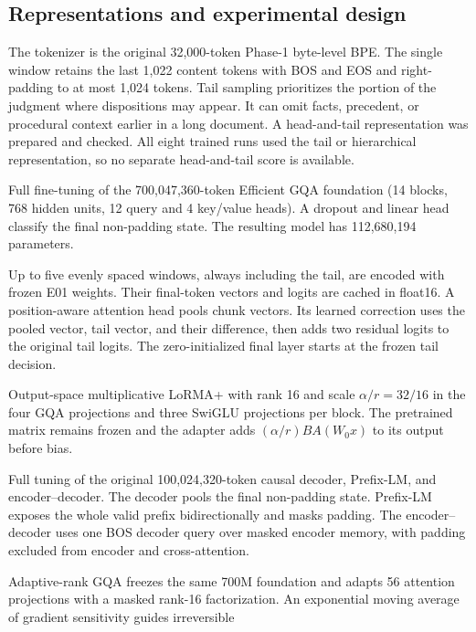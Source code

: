 \subsection{Representations and experimental design}

The tokenizer is the original 32,000-token Phase-1 byte-level BPE. The single
window retains the last 1,022 content tokens with BOS and EOS and right-padding
to at most 1,024 tokens. Tail sampling prioritizes the portion of the judgment
where dispositions may appear. It can omit facts, precedent, or procedural
context earlier in a long document. A head-and-tail representation was
prepared and checked. All eight trained runs used the tail or hierarchical
representation, so no separate head-and-tail score is available.

\begin{description}[leftmargin=1.4em]
\item[E01.] Full fine-tuning of the 700,047,360-token Efficient GQA
  foundation (14 blocks, 768 hidden units, 12 query and 4 key/value heads).
  A dropout and linear head classify the final non-padding state. The
  resulting model has 112,680,194 parameters.
\item[E02.] Up to five evenly spaced windows, always including the tail, are
  encoded with frozen E01 weights. Their final-token vectors and logits are
  cached in float16. A position-aware attention head pools chunk vectors.
  Its learned correction uses the pooled vector, tail vector, and their
  difference, then adds two residual logits to the original tail logits.
  The zero-initialized final layer starts at the frozen tail decision.
\item[E03.] Output-space multiplicative LoRMA+ with rank 16 and scale
  $\alpha/r=32/16$ in the four GQA projections and three SwiGLU projections
  per block. The pretrained matrix remains frozen and the adapter adds
  $(\alpha/r)BA(W_0x)$ to its output before bias.
\item[E04--E06.] Full tuning of the original 100,024,320-token causal decoder,
  Prefix-LM, and encoder--decoder. The decoder pools the final non-padding
  state. Prefix-LM exposes the whole valid prefix bidirectionally and masks
  padding. The encoder--decoder uses one BOS decoder query over masked
  encoder memory, with padding excluded from encoder and cross-attention.
\item[E07.] Adaptive-rank GQA freezes the same 700M foundation and adapts
  56 attention projections with a masked rank-16 factorization. An
  exponential moving average of gradient sensitivity guides irreversible

\end{description}
